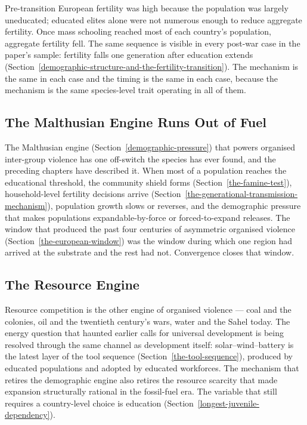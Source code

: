 \documentclass[12pt,letterpaper]{article}
\begin{document}
Pre-transition European fertility was high because the population was
largely uneducated; educated elites alone were not numerous enough to
reduce aggregate fertility. Once mass schooling reached most of each
country's population, aggregate fertility fell. The same sequence is visible in
every post-war case in the paper's sample: fertility falls one
generation after education extends
(Section~\ref{demographic-structure-and-the-fertility-transition}).
The mechanism is the same in each case and the timing is the same in
each case, because the mechanism is the same species-level trait
operating in all of them.

\subsection{The Malthusian Engine Runs Out of Fuel}\label{the-malthusian-engine}

The Malthusian engine (Section~\ref{demographic-pressure}) that powers
organised inter-group violence has one off-switch the species has ever
found, and the preceding chapters have described it. When most of a
population reaches the educational threshold, the community shield
forms (Section~\ref{the-famine-test}), household-level fertility
decisions arrive (Section~\ref{the-generational-transmission-mechanism}),
population growth slows or reverses, and the demographic pressure that
makes populations expandable-by-force or forced-to-expand releases. The
window that produced the past four centuries of asymmetric organised
violence (Section~\ref{the-european-window}) was the window during
which one region had arrived at the substrate and the rest had not.
Convergence closes that window.

\subsection{The Resource Engine}\label{the-resource-engine}

Resource competition is the other engine of organised violence ---
coal and the colonies, oil and the twentieth century's wars, water
and the Sahel today. The energy question that haunted earlier calls
for universal development is being resolved through the same channel
as development itself: solar--wind--battery is the latest layer of
the tool sequence (Section~\ref{the-tool-sequence}), produced by
educated populations and adopted by educated workforces. The
mechanism that retires the demographic engine also retires the
resource scarcity that made expansion structurally rational in the
fossil-fuel era. The variable that still requires a country-level
choice is education
(Section~\ref{longest-juvenile-dependency}).
\end{document}
